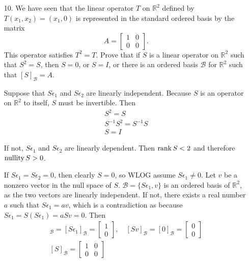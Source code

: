 \documentclass{article}
\begin{document}
\begin{enumerate}[listparindent=\parindent]
\item[10.] We have seen that the linear operator \(T\) on \(\mathbb{R}^2\) defined by \(T(x_1, x_2) = (x_1, 0)\)
    is represented in the standard ordered basis by the matrix
    \[ A = \begin{bmatrix} 1 & 0 \\ 0 & 0 \end{bmatrix}. \]
    This operator satisfies \(T^2 = T\). Prove that if \(S\) is a linear operator on \(\mathbb{R}^2\) such that \(S^2 = S\),
    then \(S = 0\), or \(S = I\), or there is an ordered basis \(\mathcal{B}\) for \(\mathbb{R}^2\) such that \([S]_\mathcal{B} = A\).

    Suppose that \(S\epsilon_1\) and \(S\epsilon_2\) are linearly independent.
    Because \(S\) is an operator on \(\mathbb{R}^2\) to itself, \(S\) must be invertible.
    Then
    \begin{gather*}
        S^2 = S \\
        S^{-1}S^2 = S^{-1}S \\
        S = I
    \end{gather*}

    If not, \(S\epsilon_1\) and \(S\epsilon_2\) are linearly dependent. Then \(\operatorname{rank} S < 2\) and therefore \(\operatorname{nullity} S > 0\).

    If \(S\epsilon_1 = S\epsilon_2 = 0\), then clearly \(S = 0\), so WLOG assume \(S\epsilon_1 \neq 0\).
    Let \(v\) be a nonzero vector in the null space of \(S\).
    \(\mathcal{B} = \{S\epsilon_1, v\}\) is an ordered basis of \(\mathbb{R}^2\), as the two vectors are linearly independent.
    If not, there exists a real number \(a\) such that \(S\epsilon_1 = av\), which is a contradiction as because
    \(S\epsilon_1 = S(S\epsilon_1) = aSv = 0\). Then
    \begin{gather*}
        [S(S\epsilon_1)]_\mathcal{B} = [S\epsilon_1]_\mathcal{B} = \begin{bmatrix} 1 \\ 0 \end{bmatrix},\quad
        [Sv]_\mathcal{B} = [0]_\mathcal{B} = \begin{bmatrix} 0 \\ 0 \end{bmatrix} \\
        [S]_\mathcal{B} = \begin{bmatrix} 1 & 0 \\ 0 & 0 \end{bmatrix}
    \end{gather*}

\end{enumerate}
\end{document}
